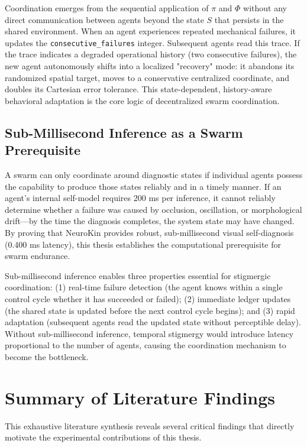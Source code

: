 \documentclass[12pt,a4paper,oneside]{report}
\begin{document}
Coordination emerges from the sequential application of $\pi$ and $\Phi$ without any direct communication between agents beyond the state $S$ that persists in the shared environment. When an agent experiences repeated mechanical failures, it updates the \texttt{consecutive\_failures} integer. Subsequent agents read this trace. If the trace indicates a degraded operational history (two consecutive failures), the new agent autonomously shifts into a localized "recovery" mode: it abandons its randomized spatial target, moves to a conservative centralized coordinate, and doubles its Cartesian error tolerance. This state-dependent, history-aware behavioral adaptation is the core logic of decentralized swarm coordination.

\subsection{Sub-Millisecond Inference as a Swarm Prerequisite}

A swarm can only coordinate around diagnostic states if individual agents possess the capability to produce those states reliably and in a timely manner. If an agent's internal self-model requires 200 ms per inference, it cannot reliably determine whether a failure was caused by occlusion, oscillation, or morphological drift—by the time the diagnosis completes, the system state may have changed. By proving that NeuroKin provides robust, sub-millisecond visual self-diagnosis (0.400 ms latency), this thesis establishes the computational prerequisite for swarm endurance.

Sub-millisecond inference enables three properties essential for stigmergic coordination: (1) real-time failure detection (the agent knows within a single control cycle whether it has succeeded or failed); (2) immediate ledger updates (the shared state is updated before the next control cycle begins); and (3) rapid adaptation (subsequent agents read the updated state without perceptible delay). Without sub-millisecond inference, temporal stigmergy would introduce latency proportional to the number of agents, causing the coordination mechanism to become the bottleneck.

\section{Summary of Literature Findings}

This exhaustive literature synthesis reveals several critical findings that directly motivate the experimental contributions of this thesis.
\end{document}
